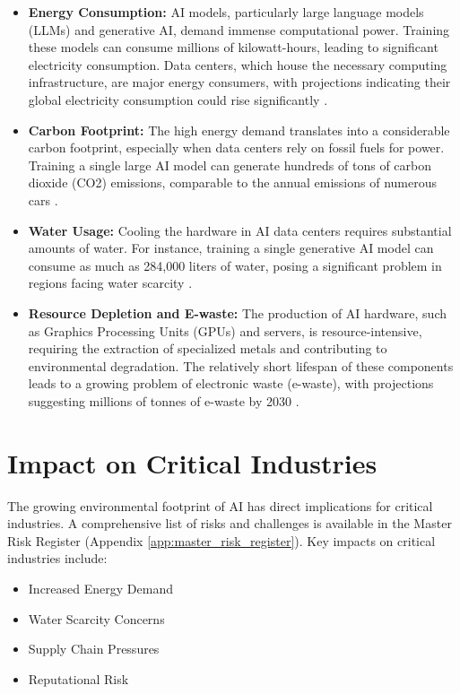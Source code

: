 \begin{itemize}
    \item \textbf{Energy Consumption:} AI models, particularly large language models (LLMs) and generative AI, demand immense computational power. Training these models can consume millions of kilowatt-hours, leading to significant electricity consumption. Data centers, which house the necessary computing infrastructure, are major energy consumers, with projections indicating their global electricity consumption could rise significantly \parencite{IEA2025}.
    \item \textbf{Carbon Footprint:} The high energy demand translates into a considerable carbon footprint, especially when data centers rely on fossil fuels for power. Training a single large AI model can generate hundreds of tons of carbon dioxide (CO2) emissions, comparable to the annual emissions of numerous cars \parencite{ColumbiaEdu2023}.
    \item \textbf{Water Usage:} Cooling the hardware in AI data centers requires substantial amounts of water. For instance, training a single generative AI model can consume as much as 284,000 liters of water, posing a significant problem in regions facing water scarcity \parencite{Li2023}.
    \item \textbf{Resource Depletion and E-waste:} The production of AI hardware, such as Graphics Processing Units (GPUs) and servers, is resource-intensive, requiring the extraction of specialized metals and contributing to environmental degradation. The relatively short lifespan of these components leads to a growing problem of electronic waste (e-waste), with projections suggesting millions of tonnes of e-waste by 2030 \parencite{Wang2024}.
\end{itemize}

\section{Impact on Critical Industries}
\label{sec:sustainability_impact}

The growing environmental footprint of AI has direct implications for critical industries. A comprehensive list of risks and challenges is available in the Master Risk Register (Appendix \ref{app:master_risk_register}). Key impacts on critical industries include:

\begin{itemize}
    \item Increased Energy Demand
    \item Water Scarcity Concerns
    \item Supply Chain Pressures
    \item Reputational Risk
\end{itemize}

